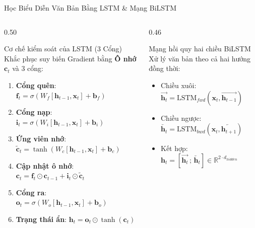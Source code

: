 \documentclass[aspectratio=169, 10pt]{beamer}
\begin{document}
\begin{frame}{Học Biểu Diễn Văn Bản Bằng LSTM \& Mạng BiLSTM}
  \begin{columns}[T, onlytextwidth]
    \begin{column}{0.50\textwidth}
      \begin{block}{Cơ chế kiểm soát của LSTM (3 Cổng)}
        \fontsize{7.5}{9.5}\selectfont
        Khắc phục suy biến Gradient bằng \textbf{Ô nhớ $\mathbf{c}_t$} và 3 cổng:
        \begin{enumerate}\setlength{\itemsep}{0.1em}
          \item \textbf{Cổng quên}: $\mathbf{f}_t = \sigma(W_f [\mathbf{h}_{t-1}, \mathbf{x}_t] + \mathbf{b}_f)$
          \item \textbf{Cổng nạp}: $\mathbf{i}_t = \sigma(W_i [\mathbf{h}_{t-1}, \mathbf{x}_t] + \mathbf{b}_i)$
          \item \textbf{Ứng viên nhớ}: $\tilde{\mathbf{c}}_t = \tanh(W_c [\mathbf{h}_{t-1}, \mathbf{x}_t] + \mathbf{b}_c)$
          \item \textbf{Cập nhật ô nhớ}: $\mathbf{c}_t = \mathbf{f}_t \odot \mathbf{c}_{t-1} + \mathbf{i}_t \odot \tilde{\mathbf{c}}_t$
          \item \textbf{Cổng ra}: $\mathbf{o}_t = \sigma(W_o [\mathbf{h}_{t-1}, \mathbf{x}_t] + \mathbf{b}_o)$
          \item \textbf{Trạng thái ẩn}: $\mathbf{h}_t = \mathbf{o}_t \odot \tanh(\mathbf{c}_t)$
        \end{enumerate}
      \end{block}
    \end{column}
    \hfill
    \begin{column}{0.46\textwidth}
      \begin{block}{Mạng hồi quy hai chiều BiLSTM}
        \fontsize{7.5}{9.5}\selectfont
        Xử lý văn bản theo cả hai hướng đồng thời:
        \begin{itemize}\setlength{\itemsep}{0.1em}
          \item Chiều xuôi: $\overrightarrow{\mathbf{h}_t} = \text{LSTM}_{fwd}(\mathbf{x}_t, \overrightarrow{\mathbf{h}_{t-1}})$
          \item Chiều ngược: $\overleftarrow{\mathbf{h}_t} = \text{LSTM}_{bwd}(\mathbf{x}_t, \overleftarrow{\mathbf{h}_{t+1}})$
          \item Kết hợp: $\mathbf{h}_t = [\overrightarrow{\mathbf{h}_t} \,;\, \overleftarrow{\mathbf{h}_t}] \in \mathbb{R}^{2 \cdot d_{hidden}}$
        \end{itemize}

\end{block}
\end{column}
\end{columns}
\end{frame}
\end{document}
